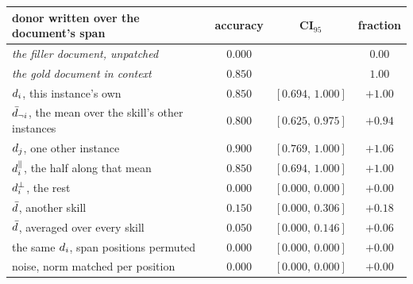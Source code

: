 \begin{tabular}{@{}lccc@{}}
\toprule
donor written over the document's span & accuracy & CI$_{95}$ & fraction \\
\midrule
\emph{the filler document, unpatched} & $0.000$ & & $0.00$ \\
\emph{the gold document in context} & $0.850$ & & $1.00$ \\
\midrule
$d_i$, this instance's own & $0.850$ & $[0.694,\,1.000]$ & $+1.00$ \\
$\bar{d}_{\neg i}$, the mean over the skill's other instances & $0.800$ & $[0.625,\,0.975]$ & $+0.94$ \\
$d_j$, one other instance & $0.900$ & $[0.769,\,1.000]$ & $+1.06$ \\
$d_i^{\parallel}$, the half along that mean & $0.850$ & $[0.694,\,1.000]$ & $+1.00$ \\
$d_i^{\perp}$, the rest & $0.000$ & $[0.000,\,0.000]$ & $+0.00$ \\
$\bar{d}$, another skill & $0.150$ & $[0.000,\,0.306]$ & $+0.18$ \\
$\bar{d}$, averaged over every skill & $0.050$ & $[0.000,\,0.146]$ & $+0.06$ \\
the same $d_i$, span positions permuted & $0.000$ & $[0.000,\,0.000]$ & $+0.00$ \\
noise, norm matched per position & $0.000$ & $[0.000,\,0.000]$ & $+0.00$ \\
\bottomrule
\end{tabular}
